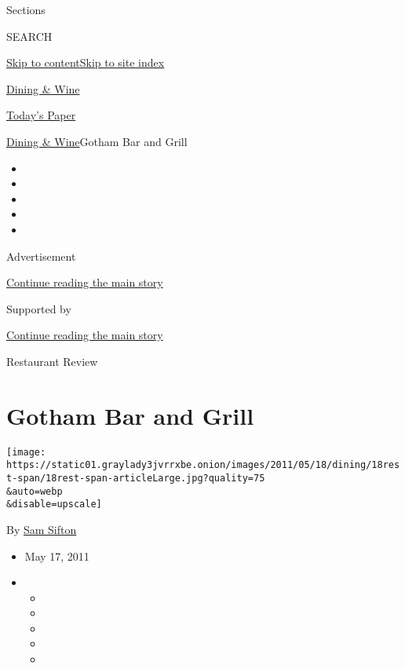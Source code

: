 Sections

SEARCH

\protect\hyperlink{site-content}{Skip to
content}\protect\hyperlink{site-index}{Skip to site index}

\href{https://www.nytimes3xbfgragh.onion/pages/dining/index.html}{Dining
\& Wine}

\href{https://myaccount.nytimes3xbfgragh.onion/auth/login?response_type=cookie\&client_id=vi}{}

\href{https://www.nytimes3xbfgragh.onion/section/todayspaper}{Today's
Paper}

\href{/pages/dining/index.html}{Dining \& Wine}\textbar{}Gotham Bar and
Grill

\begin{itemize}
\item
\item
\item
\item
\item
\end{itemize}

Advertisement

\protect\hyperlink{after-top}{Continue reading the main story}

Supported by

\protect\hyperlink{after-sponsor}{Continue reading the main story}

Restaurant Review

\hypertarget{gotham-bar-and-grill}{%
\section{Gotham Bar and Grill}\label{gotham-bar-and-grill}}

\texttt{[image: https://static01.graylady3jvrrxbe.onion/images/2011/05/18/dining/18rest-span/18rest-span-articleLarge.jpg?quality=75\\\&auto=webp\\\&disable=upscale]}

By \href{https://www.nytimes3xbfgragh.onion/by/sam-sifton}{Sam Sifton}

\begin{itemize}
\item
  May 17, 2011
\item
  \begin{itemize}
  \item
  \item
  \item
  \item
  \item
  \end{itemize}
\end{itemize}

